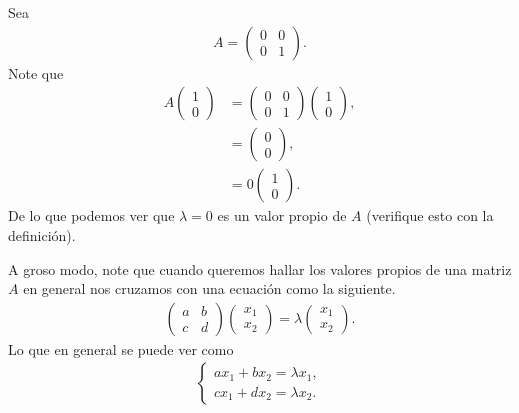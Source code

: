\begin{example}
  Sea
  \begin{align*}
    A = \begin{pmatrix}
      0 & 0 \\
      0 & 1
    \end{pmatrix}
    .
  \end{align*}
  Note que
  \begin{align*}
    A \begin{pmatrix}
      1 \\
      0
    \end{pmatrix}
    &=\begin{pmatrix}
      0 & 0 \\
      0 & 1
    \end{pmatrix}
    \begin{pmatrix}
      1 \\
      0
    \end{pmatrix},\\
    &=\begin{pmatrix}
      0 \\
      0
    \end{pmatrix}
    ,\\
    &=0 \begin{pmatrix}
      1\\
      0
    \end{pmatrix}
    .
  \end{align*}
  De lo que podemos ver que $\lambda=0$ es un valor propio de $A$ (verifique esto con la definición). 
\end{example}
A groso modo, note que cuando queremos hallar los valores propios de una matriz $A$ en general nos cruzamos con una ecuación como la siguiente.
\begin{align*}
  \begin{pmatrix}
    a & b \\
    c & d
  \end{pmatrix}
  \begin{pmatrix}
    x_1 \\
    x_2
  \end{pmatrix}
  =\lambda \begin{pmatrix}
    x_1 \\
    x_2
  \end{pmatrix}
  .
\end{align*}
Lo que en general se puede ver como
\begin{align*}
  \begin{cases}
    ax_1+bx_2=\lambda x_1, \\
    cx_1+dx_2=\lambda x_2.
  \end{cases}
\end{align*}
